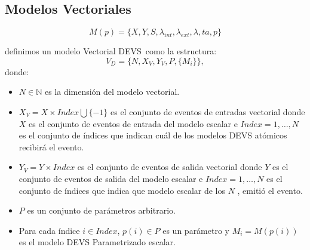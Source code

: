 \documentclass{beamer}
\begin{document}
\subsection{Modelos Vectoriales}
\begin{frame}
	\begin{equation}
		M (p) = \{X, Y, S, \lambda_{int} , \lambda_{ext} , \lambda, ta, p\}
	\end{equation}

	definimos un modelo Vectorial DEVS\ como la estructura:
	\begin{equation}
		V_D = \{N, X_V, Y_V, P, \{M_i\}\},
	\end{equation}
	donde:
	\begin{itemize}
		\item $N \in \mathbb{N}$ es la dimensión del modelo vectorial.

		\item $X_V = X \times Index \bigcup \{-1\}$ es el conjunto de eventos de entradas vectorial donde $X$ es el conjunto de eventos de entrada del modelo 
		escalar e $Index = {1, \ldots , N }$ es el conjunto de índices que indican cuál de los modelos DEVS atómicos recibirá el evento.

		\item $Y_V = Y \times Index$ es el conjunto de eventos de salida vectorial donde $Y$ es el conjunto de eventos de salida del modelo escalar e 
		$Index = {1, \ldots , N }$ es el conjunto de índices que indica que modelo escalar de los $N$ , emitió el evento. 

		\item $P$ es un conjunto de parámetros arbitrario.

		\item Para cada índice $i \in Index$, $p(i) \in P$ es un parámetro y $M_i = M (p(i))$ es el modelo DEVS Parametrizado escalar.
	\end{itemize}
\end{frame}
\end{document}
